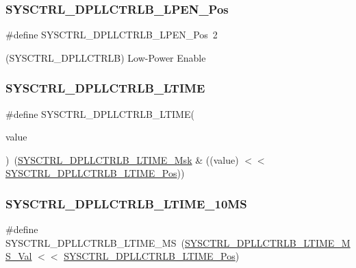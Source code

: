 \subsubsection{\texorpdfstring{SYSCTRL\_DPLLCTRLB\_LPEN\_Pos}{SYSCTRL\_DPLLCTRLB\_LPEN\_Pos}}
{\footnotesize\ttfamily \#define S\+Y\+S\+C\+T\+R\+L\+\_\+\+D\+P\+L\+L\+C\+T\+R\+L\+B\+\_\+\+L\+P\+E\+N\+\_\+\+Pos~2}



(S\+Y\+S\+C\+T\+R\+L\+\_\+\+D\+P\+L\+L\+C\+T\+R\+LB) Low-\/\+Power Enable 

\mbox{\label{group___s_a_m_d21___s_y_s_c_t_r_l_ga0656abcdfcc48d991f1307293497af6a}} 
\subsubsection{\texorpdfstring{SYSCTRL\_DPLLCTRLB\_LTIME}{SYSCTRL\_DPLLCTRLB\_LTIME}}
{\footnotesize\ttfamily \#define S\+Y\+S\+C\+T\+R\+L\+\_\+\+D\+P\+L\+L\+C\+T\+R\+L\+B\+\_\+\+L\+T\+I\+ME(\begin{DoxyParamCaption}\item[{}]{value }\end{DoxyParamCaption})~(\mbox{\hyperlink{group___s_a_m_d21___s_y_s_c_t_r_l_gae27c5423444c89dc83af4ade0ce2fe02}{S\+Y\+S\+C\+T\+R\+L\+\_\+\+D\+P\+L\+L\+C\+T\+R\+L\+B\+\_\+\+L\+T\+I\+M\+E\+\_\+\+Msk}} \& ((value) $<$$<$ \mbox{\hyperlink{group___s_a_m_d21___s_y_s_c_t_r_l_ga906665610facc5bdb428c5b237c15df5}{S\+Y\+S\+C\+T\+R\+L\+\_\+\+D\+P\+L\+L\+C\+T\+R\+L\+B\+\_\+\+L\+T\+I\+M\+E\+\_\+\+Pos}}))}

\mbox{\label{group___s_a_m_d21___s_y_s_c_t_r_l_ga46f1ffa9d304e9afbea503c953e14f2b}} 
\subsubsection{\texorpdfstring{SYSCTRL\_DPLLCTRLB\_LTIME\_10MS}{SYSCTRL\_DPLLCTRLB\_LTIME\_10MS}}
{\footnotesize\ttfamily \#define S\+Y\+S\+C\+T\+R\+L\+\_\+\+D\+P\+L\+L\+C\+T\+R\+L\+B\+\_\+\+L\+T\+I\+M\+E\+\_\+MS~(\mbox{\hyperlink{group___s_a_m_d21___s_y_s_c_t_r_l_gac745efb1fbd339720d83a2b7422d54f8}{S\+Y\+S\+C\+T\+R\+L\+\_\+\+D\+P\+L\+L\+C\+T\+R\+L\+B\+\_\+\+L\+T\+I\+M\+E\+\_\+M\+S\+\_\+\+Val}} $<$$<$ \mbox{\hyperlink{group___s_a_m_d21___s_y_s_c_t_r_l_ga906665610facc5bdb428c5b237c15df5}{S\+Y\+S\+C\+T\+R\+L\+\_\+\+D\+P\+L\+L\+C\+T\+R\+L\+B\+\_\+\+L\+T\+I\+M\+E\+\_\+\+Pos}})}

